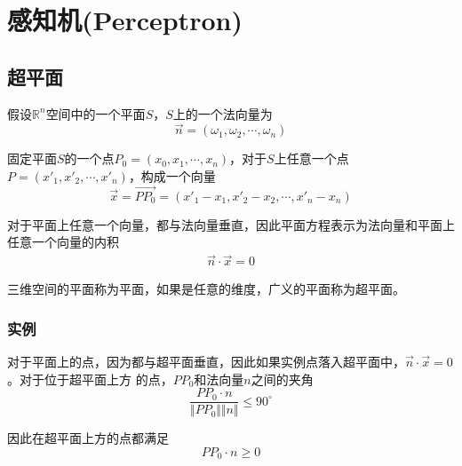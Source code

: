 \chapter{感知机(Perceptron)}


\section{超平面}

假设$\mathbb{R}^n$空间中的一个平面$S$，$S$上的一个法向量为
\begin{equation}
    \vec{n}=(\omega_1,\omega_2,\cdots,\omega_n)
\end{equation}

固定平面$S$的一个点$P_0=(x_0,x_1,\cdots,x_n)$，对于$S$上任意一个点$P=(x'_1,x'_2,\cdots,x'_n)$，构成一个向量
\begin{equation}
    \vec{x}=\Vec{PP_0}=(x'_1-x_1,x'_2-x_2,\cdots,x'_n-x_n)
\end{equation}

对于平面上任意一个向量，都与法向量垂直，因此平面方程表示为法向量和平面上任意一个向量的内积
\begin{eqnarray}
    \vec{n}\cdot \vec{x}=0
\end{eqnarray}

三维空间的平面称为平面，如果是任意的维度，广义的平面称为超平面。

\subsection*{实例}

对于平面上的点，因为都与超平面垂直，因此如果实例点落入超平面中，$\vec{n}\cdot \vec{x}=0$。对于位于超平面上方
的点，$PP_0$和法向量$n$之间的夹角
\begin{equation}
    \frac{PP_0\cdot n}{\Vert PP_0\Vert \Vert n\Vert}\leqslant 90^\circ
\end{equation}

因此在超平面上方的点都满足
\begin{equation}
    PP_0\cdot n\geqslant 0
\end{equation}

